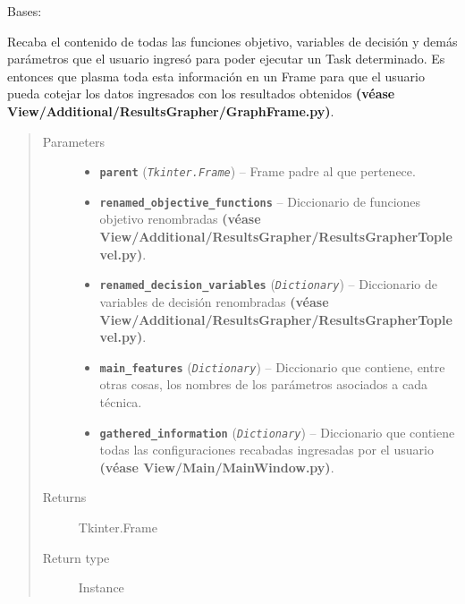 \documentclass[letterpaper,10pt,english]{sphinxmanual}
\begin{document}
\begin{fulllineitems}
\label{View/Additional/ResultsGrapher/ContentFrame:View.Additional.ResultsGrapher.ContentFrame.ContentFrame}
Bases: 

Recaba el contenido de todas las funciones objetivo, variables de decisión y demás parámetros que 
el usuario ingresó para poder ejecutar un Task determinado. Es entonces que plasma toda esta
información en un Frame para que el usuario pueda cotejar los datos ingresados con los resultados
obtenidos \textbf{(véase View/Additional/ResultsGrapher/GraphFrame.py)}.
\begin{quote}\begin{description}
\item[{Parameters}] \leavevmode\begin{itemize}
\item {} 
\textbf{\texttt{parent}} (\emph{\texttt{Tkinter.Frame}}) -- Frame padre al que pertenece.

\item {} 
\textbf{\texttt{renamed\_objective\_functions}} -- Diccionario de funciones objetivo renombradas 
\textbf{(véase View/Additional/ResultsGrapher/ResultsGrapherToplevel.py)}.

\item {} 
\textbf{\texttt{renamed\_decision\_variables}} (\emph{\texttt{Dictionary}}) -- Diccionario de variables de decisión renombradas  
\textbf{(véase View/Additional/ResultsGrapher/ResultsGrapherToplevel.py)}.

\item {} 
\textbf{\texttt{main\_features}} (\emph{\texttt{Dictionary}}) -- Diccionario que contiene, entre otras cosas, los nombres de los
parámetros asociados a cada técnica.

\item {} 
\textbf{\texttt{gathered\_information}} (\emph{\texttt{Dictionary}}) -- Diccionario que contiene todas las configuraciones 
recabadas ingresadas por el usuario \textbf{(véase View/Main/MainWindow.py)}.

\end{itemize}

\item[{Returns}] \leavevmode
Tkinter.Frame

\item[{Return type}] \leavevmode
Instance

\end{description}\end{quote}

\end{fulllineitems}
\end{document}
